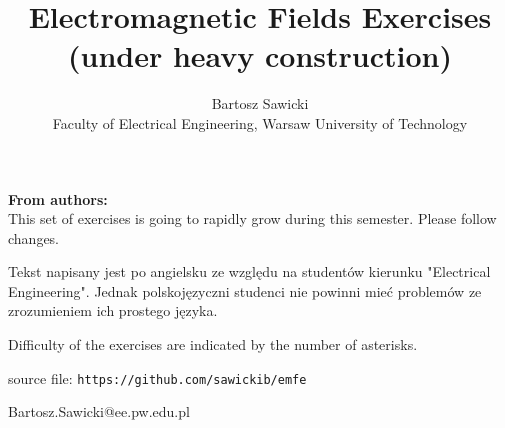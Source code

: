 \documentclass[10pt,a4paper]{article}
\title{Electromagnetic Fields Exercises\\ \vspace{0.5cm} \large{(under heavy construction)}}
\author{Bartosz Sawicki \\ \small{Faculty of Electrical Engineering, Warsaw University of Technology}}
\begin{document}
\maketitle

\noindent\textbf{From authors:}\\
This set of exercises is going to rapidly grow during this semester. Please follow changes. 

Tekst napisany jest po angielsku ze względu na studentów kierunku "Electrical Engineering". Jednak polskojęzyczni studenci nie powinni mieć problemów ze zrozumieniem ich prostego języka.

Difficulty of the exercises are indicated by the number of asterisks. 

source file: \verb+https://github.com/sawickib/emfe+

\vspace{0.3cm}
\begin{flushright}
Bartosz.Sawicki@ee.pw.edu.pl
\end{flushright}

\tableofcontents




\end{document}
